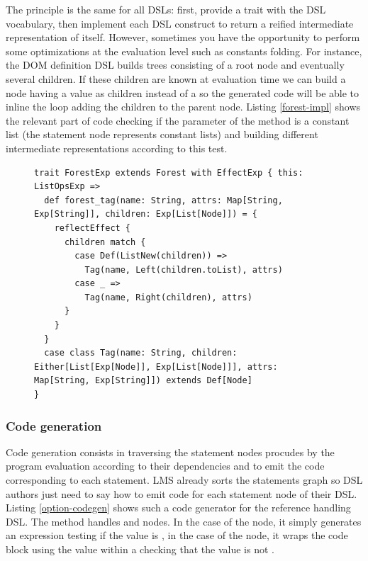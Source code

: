 \documentclass[american,english,runningheads]{llncs}
\begin{document}
The principle is the same for all DSLs: first, provide a trait with the DSL vocabulary, then implement each DSL
construct to return a reified intermediate representation of itself. However, sometimes you have the opportunity to
perform some optimizations at the evaluation level such as constants folding. For instance, the DOM definition DSL
builds trees consisting of a root node and eventually several children. If these children are known at evaluation
time we can build a node having a  value as children instead of a  so the
generated code will be able to inline the loop adding the children to the parent node. Listing \ref{forest-impl}
shows the relevant part of code checking if the  parameter of the  method is a
constant list (the  statement node represents constant lists) and building different intermediate
representations according to this test.


\begin{figure}
\begin{lstlisting}[caption=Optimized intermediate representation for the DOM definition DSL,label=forest-impl]
trait ForestExp extends Forest with EffectExp { this: ListOpsExp =>
  def forest_tag(name: String, attrs: Map[String, Exp[String]], children: Exp[List[Node]]) = {
    reflectEffect {
      children match {
        case Def(ListNew(children)) =>
          Tag(name, Left(children.toList), attrs)
        case _ =>
          Tag(name, Right(children), attrs)
      }
    }
  }
  case class Tag(name: String, children: Either[List[Exp[Node]], Exp[List[Node]]], attrs: Map[String, Exp[String]]) extends Def[Node]
}
\end{lstlisting}
\end{figure}


\subsubsection{Code generation}

Code generation consists in traversing the statement nodes procudes by the program evaluation according to their
dependencies and to emit the code corresponding to each statement. LMS already sorts the statements graph so DSL
authors just need to say how to emit code for each statement node of their DSL. Listing \ref{option-codegen} shows
such a code generator for the  reference handling DSL. The  method handles
 and  nodes. In the case of the  node, it simply
generates an expression testing if the value is , in the case of the  node, it wraps
the code block using the value within a  checking that the value is not .
\end{document}
